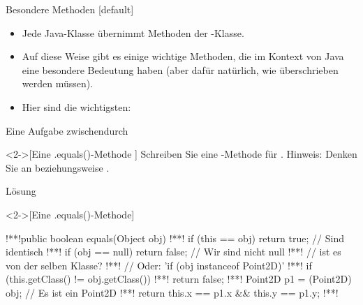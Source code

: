 \begin{frame}{Besondere Methoden}
[default]%
\begin{itemize}[<+(1)->]
    \widei
    \item Jede Java-Klasse übernimmt Methoden der -Klasse.
    \item Auf diese Weise gibt es einige wichtige Methoden,\pause{} die im Kontext von Java eine besondere Bedeutung haben\pause{} (aber dafür natürlich, wie  überschrieben werden müssen).
    \item Hier sind die wichtigsten: 
\end{itemize}
\end{frame}

\ifull
\begin{frame}[c]{Eine Aufgabe zwischendurch}
    \begin{exercise}<2->[Eine .equals()-Methode ]
        Schreiben Sie eine -Methode für .\pause{} Hinweis: Denken Sie an  beziehungsweise .
    \end{exercise}
\end{frame}

\begin{frame}[c,fragile]{Lösung}
    \begin{solve}<2->[Eine .equals()-Methode]
\begin{plainjava}
!**!public boolean equals(Object obj) {
!**!    if (this == obj) return true; // Sind identisch
!**!    if (obj == null) return false; // Wir sind nicht null
!**!    // ist es von der selben Klasse?
!**!    // Oder: 'if (obj instanceof Point2D)'
!**!    if (this.getClass() != obj.getClass())
!**!        return false;
!**!    Point2D p1 = (Point2D) obj; // Es ist ein Point2D
!**!    return this.x == p1.x && this.y == p1.y;
!**!}
\end{plainjava}
    \end{solve}
\end{frame}
\fi

